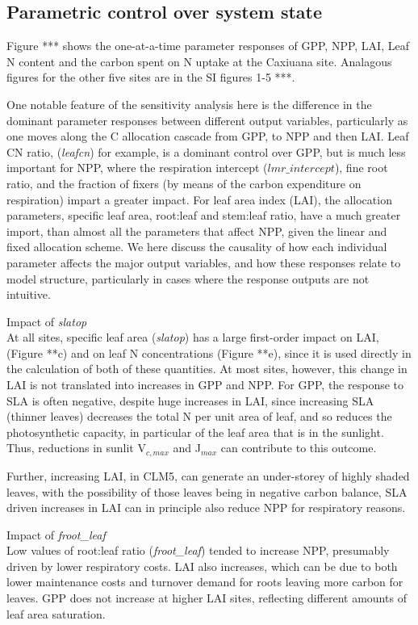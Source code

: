 \documentclass[draft,linenumbers]{agujournal}
\begin{document}
\subsection{Parametric control over system state}
Figure *** shows the one-at-a-time parameter responses of GPP, NPP, LAI, Leaf N content and the carbon spent on N uptake at the Caxiuana site. Analagous figures for the other five sites are in the SI figures 1-5 ***.

One notable feature of the sensitivity analysis here is the difference in the dominant parameter responses between different output variables, particularly as one moves along the C allocation cascade from GPP, to NPP and then LAI. Leaf CN ratio, (\emph{leafcn}) for example, is a dominant control over GPP, but is much less important for NPP, where the respiration intercept ($lmr\_{intercept}$), fine root ratio, and the fraction of fixers (by means of the carbon expenditure on respiration) impart a greater impact. For leaf area index (LAI), the allocation parameters, specific leaf area, root:leaf and stem:leaf ratio, have a much greater import, than almost all the parameters that affect NPP, given the linear and fixed allocation scheme. We here discuss the causality of how each individual parameter affects the major output variables, and how these responses relate to model structure, particularly in cases where the response outputs are not intuitive. 

Impact of \emph{slatop}\\
At all sites, specific leaf area (\emph{slatop}) has a large first-order impact on LAI, (Figure **c) and on leaf N concentrations (Figure **e), since it is used directly in the calculation of both of these quantities. At most sites, however, this change in LAI is not translated into increases in GPP and NPP. For GPP, the response to SLA is often negative, despite huge increases in LAI, since increasing SLA (thinner leaves) decreases the total N per unit area of leaf, and so reduces the photosynthetic capacity, in particular of the leaf area that is in the sunlight. Thus, reductions in sunlit V$_{c,max}$ and J$_{max}$ can contribute to this outcome.

Further, increasing LAI, in CLM5, can generate an under-storey of highly shaded leaves, with the possibility of those leaves being in negative carbon balance,  SLA driven increases in LAI can in principle also reduce NPP for respiratory reasons. 

Impact of \emph{froot\_leaf}\\
Low values of root:leaf ratio (\emph{froot\_leaf}) tended to increase NPP, presumably driven by lower respiratory costs. LAI also increases, which can be due to both lower maintenance costs and turnover demand for roots leaving more carbon for leaves.  GPP does not increase at higher LAI sites, reflecting different amounts of leaf area saturation.
\end{document}
